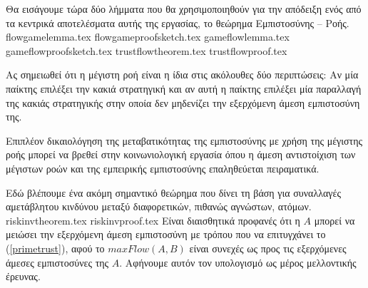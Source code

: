   Θα εισάγουμε τώρα δύο λήμματα που θα χρησιμοποιηθούν για την απόδειξη ενός από τα κεντρικά αποτελέσματα αυτής της εργασίας,
  το θεώρημα Εμπιστοσύνης -- Ροής.
  {flowgamelemma.tex}
  {flowgameproofsketch.tex}
  {gameflowlemma.tex}
  {gameflowproofsketch.tex}
  {trustflowtheorem.tex}
  {trustflowproof.tex}

  Ας σημειωθεί ότι η μέγιστη ροή είναι η ίδια στις ακόλουθες δύο περιπτώσεις: Αν μία παίκτης επιλέξει την κακιά στρατηγική και
  αν αυτή η παίκτης επιλέξει μία παραλλαγή της κακιάς στρατηγικής στην οποία δεν μηδενίζει την εξερχόμενη άμεση εμπιστοσύνη
  της.

  Επιπλέον δικαιολόγηση της μεταβατικότητας της εμπιστοσύνης με χρήση της μέγιστης ροής μπορεί να βρεθεί στην κοινωνιολογική
  εργασία \cite{kmrs} όπου η άμεση αντιστοίχιση των μέγιστων ροών και της εμπειρικής εμπιστοσύνης επαληθεύεται πειραματικά.

  Εδώ βλέπουμε ένα ακόμη σημαντικό θεώρημα που δίνει τη βάση για συναλλαγές αμετάβλητου κινδύνου μεταξύ διαφορετικών, πιθανώς
  αγνώστων, ατόμων.
  {riskinvtheorem.tex}
  {riskinvproof.tex}
  Είναι διαισθητικά προφανές ότι η $A$ μπορεί να μειώσει την εξερχόμενη άμεση εμπιστοσύνη με τρόπου που να επιτυγχάνει το
  (\ref{primetrust}), αφού το $maxFlow\left(A, B\right)$ είναι συνεχές ως προς τις εξερχόμενες άμεσες εμπιστοσύνες της $A$.
  Αφήνουμε αυτόν τον υπολογισμό ως μέρος μελλοντικής έρευνας.
